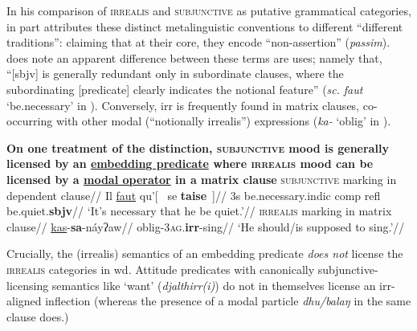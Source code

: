  In his comparison of \textsc{irrealis} and \textsc{subjunctive} as putative grammatical categories, \citet[185]{Palmer2001} in part attributes these distinct metalinguistic conventions to different ``different traditions'': claiming that at their core, they encode ``non-assertion'' (\textit{passim}). \citet{Palmer2001} does note an apparent difference between these terms are uses; namely that, ``[\gls{sbjv}] is generally redundant only in subordinate clauses, where the subordinating [predicate] clearly indicates the notional feature'' (\textit{sc.} \textit{faut} `be.necessary' in ). Conversely, \gls{irr} is frequently found in matrix clauses, co-occurring with other modal (``notionally irrealis'') expressions (\textit{ka-} `\gls{oblig}' in ).

\pex{} \textbf{On one treatment of the distinction, \textsc{subjunctive} mood is generally licensed by an \ul{embedding predicate} where \textsc{irrealis} mood can be licensed by a \ul{modal operator} in a matrix clause}
\a\begingl\glpreamble{}\textsc{subjunctive} marking in dependent clause//
\gla Il \ul{faut} qu'\textup{[}~ se \textbf{taise}~\textup{]}//
\glb 3s be.necessary.\gls{indic} \gls{comp} \gls{refl} be.quiet.\textbf{\gls{sbjv}}//
\glft`It's necessary that he be quiet.'//\endgl
\a\begingl\glpreamble {}  \textsc{irrealis} marking in matrix clause//
\gla \ul{kas}-\textbf{sa}-náyʔaw//
\glb \gls{oblig}-3\textsc{ag}.\textbf{\gls{irr}}-sing//
\glft`He should/is supposed to sing.'//\endgl
\xe


Crucially, the (irrealis) semantics of an embedding predicate \textit{does not} license the \textsc{irrealis} categories in \gls{wd}. Attitude predicates with canonically subjunctive-licensing semantics like `want' (\textit{djalthirr(i)}) do not in themselves license an \gls{irr}-aligned inflection (whereas the presence of a modal particle \textit{dhu/balaŋ} in the same clause does.)

